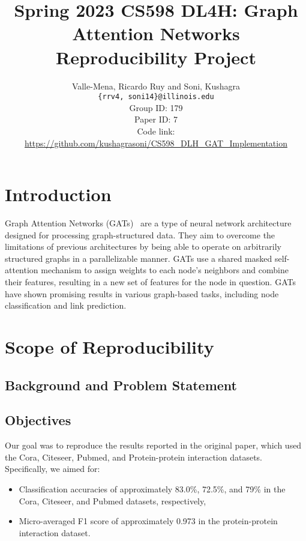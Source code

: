 \documentclass{article}
\title{Spring 2023 CS598 DL4H: Graph Attention Networks Reproducibility Project}
\author
{Valle-Mena, Ricardo Ruy and Soni, Kushagra \\
    \texttt{\{rrv4, soni14\}@illinois.edu}
    \\[2em]
    Group ID: 179\\
    Paper ID: 7\\
    Code link: \url{https://github.com/kushagrasoni/CS598_DLH_GAT_Implementation}
    \\[2em]
}
\begin{document}
    \maketitle
\section{Introduction}\label{sec:introduction}
    Graph Attention Networks (GATs)~\cite{velickovic2018graph} are a type of neural network architecture designed for
    processing graph-structured data.
    They aim to overcome the limitations of previous architectures by being able to operate on arbitrarily structured graphs in a parallelizable manner.
    GATs use a shared masked self-attention mechanism to assign weights to each node's neighbors and combine their features, resulting in a new set of features for the node in question.
    GATs have shown promising results in various graph-based tasks, including node classification and link prediction.

    \section{Scope of Reproducibility}\label{sec:scope-of-reproducibility}

    \subsection{Background and Problem Statement}\label{sec:background-and-problem-statement}
    

    \subsection{Objectives}\label{sec:objectives}
    Our goal was to reproduce the results reported in the original paper, which used the Cora, Citeseer, Pubmed, and Protein-protein interaction datasets.
    Specifically, we aimed for:
    \begin{itemize}
        \item Classification accuracies of approximately 83.0\%, 72.5\%, and 79\% in the Cora, Citeseer, and Pubmed
        datasets, respectively,
        \item Micro-averaged F1 score of approximately 0.973 in the protein-protein interaction dataset.
    \end{itemize}
\end{document}
